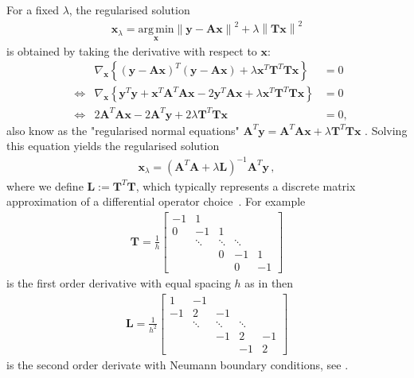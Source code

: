 For a fixed $\lambda$, the regularised solution
\begin{align}
	\bm{x}_{\lambda} = \underset{\bm{x}}{\mathrm{arg\,min}} \left\lVert \bm{y} - \bm{A} \bm{x} \right\rVert^2 + \lambda \left\lVert \bm{T} \bm{x} \right\rVert^2
\end{align}
is obtained by taking the derivative with respect to $\bm{x}$:
\begin{align}
	& & \nabla_{\bm{x}} \left\{ (\bm{y} - \bm{A} \bm{x})^T (\bm{y} - \bm{A} \bm{x}) + \lambda \bm{x}^T \bm{T}^T \bm{T} \bm{x} \right\} &= 0 \\
	&\iff & \nabla_{\bm{x}} \left\{ \bm{y}^T \bm{y} + \bm{x}^T \bm{A}^T \bm{A} \bm{x} - 2 \bm{y}^T \bm{A} \bm{x} + \lambda \bm{x}^T \bm{T}^T \bm{T} \bm{x} \right\} &= 0 \\
	&\iff & 2 \bm{A}^T \bm{A} \bm{x} - 2 \bm{A}^T \bm{y} + 2 \lambda \bm{T}^T \bm{T} \bm{x} &= 0,
\end{align}
also know as the "regularised normal equations" $\bm{A}^T \bm{y} = \bm{A}^T \bm{A} \bm{x} + \lambda \bm{T}^T \bm{T} \bm{x}$ \cite{Hansen2001LCurve}.
Solving this equation yields the regularised solution
\begin{align}
	\bm{x}_{\lambda} = (\bm{A}^T \bm{A} + \lambda \bm{L})^{-1} \bm{A}^T \bm{y} \, , \label{eq:regSol}
\end{align}
where we define $\bm{L} := \bm{T}^T \bm{T}$, which typically represents a discrete matrix approximation of a differential operator choice~\cite{tan2016LecNot}.
For example
\begin{align}
	\bm{T} = \frac{1}{h}
	\begin{bmatrix}
		-1 & 1 & & &  \\
		0 & -1 & 1 & &   \\
		& \ddots & \ddots & \ddots &\\ 
		& & 0 & -1 & 1  \\
		& & & 0 & -1 
	\end{bmatrix} 
\end{align}
is the first order derivative with equal spacing $h$ as in \cite{tan2016LecNot} then
\begin{align}
	\bm{L} = \frac{1}{h^2}
	\begin{bmatrix}
		1 & -1 & & &  \\
		-1 & 2& -1 & &   \\
		& \ddots & \ddots & \ddots &\\ 
		& & -1 & 2 & -1  \\
		& & & -1 & 2 
	\end{bmatrix} 
\end{align}
is the second order derivate with Neumann boundary conditions, see \cite{wang2015graphs}.

